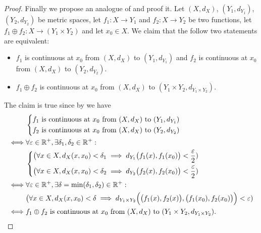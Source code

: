 \begin{proof}
  Finally we propose an analogue of  and proof it.
  Let \((X, d_X)\), \((Y_1, d_{Y_1})\), \((Y_2, d_{Y_2})\) be metric spaces, let \(f_1 : X \to Y_1\) and \(f_2 : X \to Y_2\) be two functions, let \(f_1 \oplus f_2 : X \to (Y_1 \times Y_2)\) and let \(x_0 \in X\).
  We claim that the follow two statements are equivalent:
  \begin{itemize}
    \item \(f_1\) is continuous at \(x_0\) from \((X, d_X)\) to \((Y_1, d_{Y_1})\) and \(f_2\) is continuous at \(x_0\) from \((X, d_X)\) to \((Y_2, d_{Y_2})\).
    \item \(f_1 \oplus f_2\) is continuous at \(x_0\) from \((X, d_X)\) to \((Y_1 \times Y_2, d_{Y_1 \times Y_2})\).
  \end{itemize}
  The claim is true since by  we have
  \begin{align*}
         & \begin{dcases}
             f_1 \text{ is continuous at } x_0 \text{ from } (X, d_X) \text{ to } (Y_1, d_{Y_1}) \\
             f_2 \text{ is continuous at } x_0 \text{ from } (X, d_X) \text{ to } (Y_2, d_{Y_2})
           \end{dcases}                                                                   \\
    \iff & \forall \varepsilon \in \mathbb{R}^+, \exists \delta_1, \delta_2 \in \mathbb{R}^+ :                                                                                   \\
         & \begin{dcases}
             \big(\forall x \in X, d_X(x, x_0) < \delta_1 \implies d_{Y_1}\big(f_1(x), f_1(x_0)\big) < \dfrac{\varepsilon}{2}) \\
             \big(\forall x \in X, d_X(x, x_0) < \delta_2 \implies d_{Y_2}\big(f_2(x), f_2(x_0)\big) < \dfrac{\varepsilon}{2})
           \end{dcases}                                     \\
    \iff & \forall \varepsilon \in \mathbb{R}^+, \exists \delta = \min(\delta_1, \delta_2) \in \mathbb{R}^+ :                                                                    \\
         & \big(\forall x \in X, d_X(x, x_0) < \delta \implies d_{Y_1 \times Y_2}\Big(\big(f_1(x), f_2(x)\big), \big(f_1(x_0), f_2(x_0)\big)\Big) < \varepsilon) \\
    \iff & f_1 \oplus f_2 \text{ is continuous at } x_0 \text{ from } (X, d_X) \text{ to } (Y_1 \times Y_2, d_{Y_1 \times Y_2}).
  \end{align*}
\end{proof}

